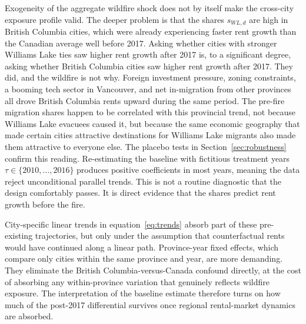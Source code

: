 \documentclass[12pt]{article}
\begin{document}
Exogeneity of the aggregate wildfire shock does not by itself make the
cross-city exposure profile valid. The deeper problem is that the shares
$s_{WL,d}$ are high in British Columbia cities, which were already experiencing
faster rent growth than the Canadian average well before 2017. Asking whether cities with stronger Williams Lake ties saw higher
rent growth after 2017 is, to a significant degree, asking whether British
Columbia cities saw higher rent growth after 2017. They did, and the wildfire
is not why. Foreign investment pressure, zoning constraints, a booming tech
sector in Vancouver, and net in-migration from other provinces all drove British Columbia
rents upward during the same period. The pre-fire migration shares happen to
be correlated with this provincial trend, not because Williams Lake evacuees
caused it, but because the same economic geography that made certain cities
attractive destinations for Williams Lake migrants also made them attractive
to everyone else. The placebo tests in Section~\ref{sec:robustness} confirm
this reading. Re-estimating the baseline with fictitious treatment years
$\tau\in\{2010,\ldots,2016\}$ produces positive coefficients in most years,
meaning the data reject unconditional parallel trends. This is not a
routine diagnostic that the design comfortably passes. It is direct evidence
that the shares predict rent growth before the fire.

City-specific linear trends in equation~\eqref{eq:trends} absorb part of these
pre-existing trajectories, but only under the assumption that counterfactual
rents would have continued along a linear path. Province-year fixed effects,
which compare only cities within the same province and year, are more demanding.
They eliminate the British Columbia-versus-Canada confound directly, at the cost of absorbing
any within-province variation that genuinely reflects wildfire exposure.
The interpretation of the baseline estimate therefore turns on how much of the
post-2017 differential survives once regional rental-market dynamics are absorbed.
\end{document}

